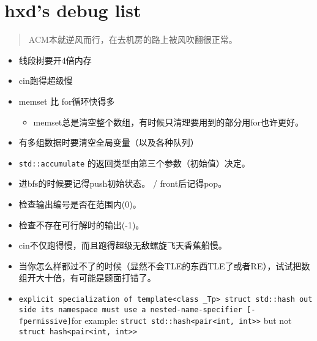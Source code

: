 \hypertarget{hxds-debug-list}{%
\section{hxd's debug list}\label{hxds-debug-list}}

\begin{quote}
ACM本就逆风而行，在去机房的路上被风吹翻很正常。
\end{quote}

\begin{itemize}
\tightlist
\item
  线段树要开4倍内存
\item
  cin跑得超级慢
\item
  memset 比 for循环快得多

  \begin{itemize}
  \tightlist
  \item
    memset总是清空整个数组，有时候只清理要用到的部分用for也许更好。
  \end{itemize}
\item
  有多组数据时要清空全局变量（以及各种队列）
\item
  \texttt{std::accumulate} 的返回类型由第三个参数（初始值）决定。
\item
  进bfs的时候要记得push初始状态。 / front后记得pop。
\item
  检查输出编号是否在范围内(0)。
\item
  检查不存在可行解时的输出(-1)。
\item
  cin不仅跑得慢，而且跑得超级无敌螺旋飞天香蕉船慢。
\item
  当你怎么样都过不了的时候（显然不会TLE的东西TLE了或者RE），试试把数组开大十倍，有可能是题面打错了。
\item
  \texttt{explicit\ specialization\ of\ \textquotesingle{}template\textless{}class\ \_Tp\textgreater{}\ struct\ std::hash\textquotesingle{}\ outside\ its\ namespace\ must\ use\ a\ nested-name-specifier\ {[}-fpermissive{]}}for
  example:
  \texttt{struct\ std::hash\textless{}pair\textless{}int,\ int\textgreater{}\textgreater{}}
  but not
  \texttt{struct\ hash\textless{}pair\textless{}int,\ int\textgreater{}\textgreater{}}
\end{itemize}

\hypertarget{__comment}{}
